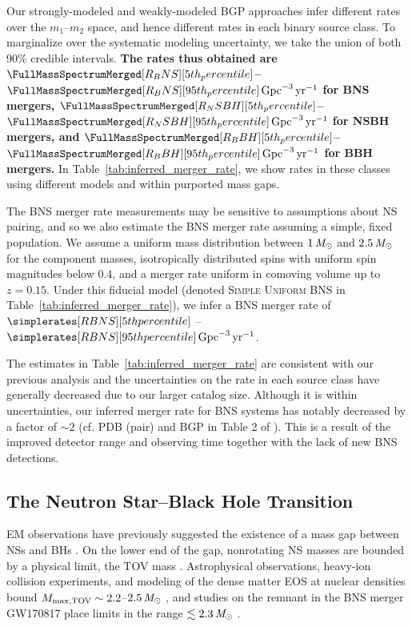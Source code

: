 Our strongly-modeled \PDB and weakly-modeled \ac{BGP} approaches infer different rates over the $m_1$--$m_2$ space, and hence different rates in each binary source class. 
To marginalize over the systematic modeling uncertainty, we take the union of both 90\% credible intervals.
\textbf{\boldmath The rates thus obtained are ${\FullMassSpectrumMerged[R_BNS][5th_percentile]}$--${\FullMassSpectrumMerged[R_BNS][95th_percentile]\,{\perGpcyr}}$ for \ac{BNS} mergers, ${\FullMassSpectrumMerged[R_NSBH][5th_percentile]}$--${\FullMassSpectrumMerged[R_NSBH][95th_percentile]\,{\perGpcyr}}$ for \ac{NSBH} mergers, and ${\FullMassSpectrumMerged[R_BBH][5th_percentile]}$--${\FullMassSpectrumMerged[R_BBH][95th_percentile]\,{\perGpcyr}}$ for \ac{BBH} mergers.}
In Table~\ref{tab:inferred_merger_rate}, we show rates in these classes using different models and within purported mass gaps.

The \ac{BNS} merger rate measurements may be sensitive to assumptions about \ac{NS} pairing, and so we also estimate the \ac{BNS} merger rate assuming a simple, fixed population. 
We assume a uniform mass distribution between $1\,\mathit{M_\odot}$ and $2.5\,\mathit{M_\odot}$ for the component masses, isotropically distributed spins with uniform spin magnitudes below $0.4$, and a merger rate uniform in comoving volume up to $z=0.15$. 
Under this fiducial model (denoted \textsc{Simple Uniform BNS} in Table~\ref{tab:inferred_merger_rate}), we infer a \ac{BNS} merger rate of $\simplerates[RBNS][5th percentile]$ -- $\simplerates[RBNS][95th percentile]\,\perGpcyr$. 

The estimates in Table~\ref{tab:inferred_merger_rate} are consistent with our previous analysis \citep{KAGRA:2021duu} and the uncertainties on the rate in each source class have generally decreased due to our larger catalog size. 
Although it is within uncertainties, our inferred merger rate for \ac{BNS} systems has notably decreased by a factor of $\sim 2$ (cf. PDB (pair) and \ac{BGP} in Table 2 of \citealt{KAGRA:2021duu}). 
This is a result of the improved detector range and observing time together with the lack of new \ac{BNS} detections. 

\subsection{The Neutron Star--Black Hole Transition}
\label{sec:lower_mass_gap}

\Ac{EM} observations have previously suggested the existence of a mass gap between \acp{NS} and \acp{BH} \citep{Bailyn:1997xt, Ozel:2010su, Farr:2010tu}. 
On the lower end of the gap, nonrotating \ac{NS} masses are bounded by a physical limit, the \ac{TOV} mass \citep[e.g.,][]{Kalogera:1996ci}. 
Astrophysical observations, heavy-ion collision experiments, and modeling of the dense matter \ac{EOS} at nuclear densities bound $M_{\rm max, TOV} \sim 2.2$--$2.5\,\mathit{M_\odot}$ \citep{Landry:2020vaw, Dietrich:2020efo, Legred:2021hdx, Huth:2021bsp, Ai:2023ykc, Dittmann:2024mbo, Rutherford:2024srk, Koehn:2024set}, and
studies on the remnant in the \ac{BNS} merger GW170817 \citep{LIGOScientific:2017vwq} place limits in the range $\lesssim 2.3\,\mathit{M_\odot}$ \citep{Margalit:2017dij,Rezzolla:2017aly,Ruiz:2017due,LIGOScientific:2019eut,Nathanail:2021tay}. 

